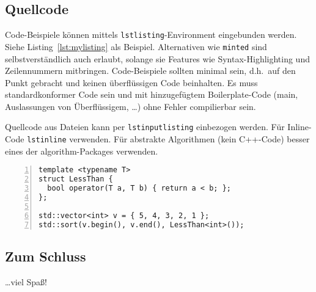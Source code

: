 \documentclass[a4paper,12pt]{llncs}
\numberwithin{equation}{section}
\begin{document}
\subsection{Quellcode}
Code-Beispiele können mittels \texttt{lstlisting}-Environment eingebunden
werden.
Siehe Listing~\ref{lst:mylisting} als Beispiel.
Alternativen wie \texttt{minted} sind selbstverständlich auch erlaubt, solange
sie Features wie Syntax-Highlighting und Zeilennummern mitbringen.
Code-Beispiele sollten minimal sein, d.h.\ auf den Punkt gebracht und keinen
überflüssigen Code beinhalten.
Es muss standardkonformer Code sein und mit hinzugefügtem Boilerplate-Code
(main, Auslassungen von Überflüssigem, \dots) ohne Fehler compilierbar sein.

Quellcode aus Dateien kann per \texttt{lstinputlisting} einbezogen werden.
Für Inline-Code \texttt{lstinline} verwenden.
Für abstrakte Algorithmen (kein C++-Code) besser eines der algorithm-Packages
verwenden.

\begin{lstlisting}[style=cpp,caption={Example using Lstlisting},label={lst:mylisting},numbers=left]
template <typename T>
struct LessThan {
  bool operator(T a, T b) { return a < b; };
};

std::vector<int> v = { 5, 4, 3, 2, 1 };
std::sort(v.begin(), v.end(), LessThan<int>());
\end{lstlisting}


\subsection{Zum Schluss}
\dots viel Spaß!

\newpage



\end{document}
